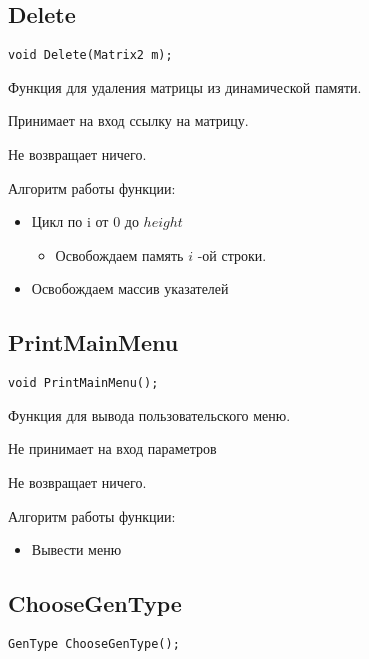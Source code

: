 \documentclass[12pt,a4paper]{article}  %
\begin{document}
	\subsection*{Delete}

	\begin{lstlisting}[label={lst:Delete}]
		void Delete(Matrix2 m);
	\end{lstlisting}

	Функция для удаления матрицы из динамической памяти.

	Принимает на вход ссылку на матрицу.

	Не возвращает ничего.

	Алгоритм работы функции:

	\begin{itemize}
		\item Цикл по i от 0 до $ height $
		\begin{itemize}
			\item Освобождаем память $ i $ -ой строки.
		\end{itemize}
		\item Освобождаем массив указателей
	\end{itemize}

	\subsection*{PrintMainMenu}

	\begin{lstlisting}[label={lst:PrintMainMenu}]
		void PrintMainMenu();
	\end{lstlisting}

	Функция для вывода пользовательского меню.

	Не принимает на вход параметров

	Не возвращает ничего.

	Алгоритм работы функции:

	\begin{itemize}
		\item Вывести меню
	\end{itemize}

	\subsection*{ChooseGenType}

	\begin{lstlisting}[label={lst:ChooseGenType}]
		GenType ChooseGenType();
	\end{lstlisting}
\end{document}
